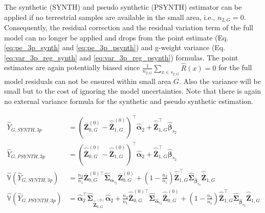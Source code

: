 \documentclass[article]{jss}
\newcommand{\var}{\mathbb{V}}
\begin{document}

The synthetic (SYNTH) and pseudo synthetic (PSYNTH) estimator can be applied if no terrestrial samples are available in the small area, i.e., $n_{2,G}=0$. Consequently, the residual correction and the residual variation term of the full model can no longer be applied and drops from the point estimate (Eq. \ref{eq:pe_3p_synth} and \ref{eq:pe_3p_psynth}) and g-weight variance (Eq. \ref{eq:var_3p_reg_synth} and \ref{eq:var_3p_reg_psynth}) formulas. The point estimates are again potentially biased since $\frac{1}{n_{2,G}}\sum_{x \in s_{2,G}}\hat{R}(x)=0$ for the full model residuals can not be ensured within small area $G$. Also the variance will be small but to the cost of ignoring the model uncertainties. Note that there is again no external variance formula for the synthetic and pseudo synthetic estimation.

\begin{subequations}\label{eq:3p_synth_psynth}
\begin{align}
\hat{Y}_{G,SYNTH,3p}&=(\bar{\pmb{Z}}^{(0)}_{0,G}-\hat{\bar{\pmb{Z}}}^{(0)}_{1,G})^{\top}\hat{\pmb{\alpha}}_2 +
\hat{\bar{\pmb{Z}}}^{\top}_{1,G}\hat{\pmb{\beta}}_{s_2} \label{eq:pe_3p_synth} \\
\hat{Y}_{G,PSYNTH,3p}&=(\hat{\bar{\pmb{Z}}}^{(0)}_{0,G}-\hat{\bar{\pmb{Z}}}^{(0)}_{1,G})^{\top}\hat{\pmb{\alpha}}_2 +
\hat{\bar{\pmb{Z}}}^{\top}_{1,G}\hat{\pmb{\beta}}_{s_2}\label{eq:pe_3p_psynth} \\
\hat{\var}(\hat{Y}_{G,SYNTH,3p})& =\frac{n_2}{n_1}\bar{\pmb{Z}}^{(0)\top}_{0,G}\hat{\pmb{\Sigma}}_{\hat{\pmb{\alpha}}_{s_2}}
\bar{\pmb{Z}}^{(0)}_{0,G}+(1-\frac{n_2}{n_1})\hat{\bar{\pmb{Z}}}_{1,G}^{\top}\hat{\pmb{\Sigma}}_{\hat{\pmb{\beta}}_{s_2}}
\hat{\bar{\pmb{Z}}}_{1,G} \label{eq:var_3p_reg_synth}\\
\hat{\var}(\hat{Y}_{G,PSYNTH,3p})& = \hat{\pmb{\alpha}}_2^{\top}\hat{\pmb{\Sigma}}_{\hat{\bar{\pmb{Z}}}^{(0)}_{0,G}}\hat{\pmb{\alpha}}_2 +
\frac{n_2}{n_1}\hat{\bar{\pmb{Z}}}^{(0)\top}_{0,G}\hat{\pmb{\Sigma}}_{\hat{\pmb{\alpha}}_{s_2}}
\hat{\bar{\pmb{Z}}}^{(0)}_{0,G}+(1-\frac{n_2}{n_1})\hat{\bar{\pmb{Z}}}_{1,G}^{\top}\hat{\pmb{\Sigma}}_{\hat{\pmb{\beta}}_{s_2}}
\hat{\bar{\pmb{Z}}}_{1,G} \label{eq:var_3p_reg_psynth}
\end{align}
\end{subequations}


\end{document}
